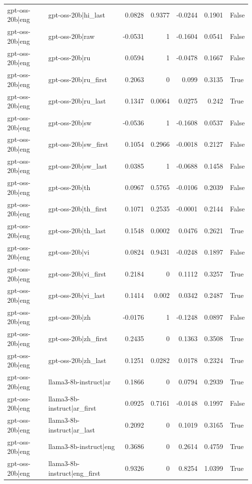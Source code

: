 \begin{table}
\begin{tabular}{l l r r r r l}
gpt-oss-20b|eng & gpt-oss-20b|hi_last & 0.0828 & 0.9377 & -0.0244 & 0.1901 & False \\
gpt-oss-20b|eng & gpt-oss-20b|raw & -0.0531 & 1 & -0.1604 & 0.0541 & False \\
gpt-oss-20b|eng & gpt-oss-20b|ru & 0.0594 & 1 & -0.0478 & 0.1667 & False \\
gpt-oss-20b|eng & gpt-oss-20b|ru_first & 0.2063 & 0 & 0.099 & 0.3135 & True \\
gpt-oss-20b|eng & gpt-oss-20b|ru_last & 0.1347 & 0.0064 & 0.0275 & 0.242 & True \\
gpt-oss-20b|eng & gpt-oss-20b|sw & -0.0536 & 1 & -0.1608 & 0.0537 & False \\
gpt-oss-20b|eng & gpt-oss-20b|sw_first & 0.1054 & 0.2966 & -0.0018 & 0.2127 & False \\
gpt-oss-20b|eng & gpt-oss-20b|sw_last & 0.0385 & 1 & -0.0688 & 0.1458 & False \\
gpt-oss-20b|eng & gpt-oss-20b|th & 0.0967 & 0.5765 & -0.0106 & 0.2039 & False \\
gpt-oss-20b|eng & gpt-oss-20b|th_first & 0.1071 & 0.2535 & -0.0001 & 0.2144 & False \\
gpt-oss-20b|eng & gpt-oss-20b|th_last & 0.1548 & 0.0002 & 0.0476 & 0.2621 & True \\
gpt-oss-20b|eng & gpt-oss-20b|vi & 0.0824 & 0.9431 & -0.0248 & 0.1897 & False \\
gpt-oss-20b|eng & gpt-oss-20b|vi_first & 0.2184 & 0 & 0.1112 & 0.3257 & True \\
gpt-oss-20b|eng & gpt-oss-20b|vi_last & 0.1414 & 0.002 & 0.0342 & 0.2487 & True \\
gpt-oss-20b|eng & gpt-oss-20b|zh & -0.0176 & 1 & -0.1248 & 0.0897 & False \\
gpt-oss-20b|eng & gpt-oss-20b|zh_first & 0.2435 & 0 & 0.1363 & 0.3508 & True \\
gpt-oss-20b|eng & gpt-oss-20b|zh_last & 0.1251 & 0.0282 & 0.0178 & 0.2324 & True \\
gpt-oss-20b|eng & llama3-8b-instruct|ar & 0.1866 & 0 & 0.0794 & 0.2939 & True \\
gpt-oss-20b|eng & llama3-8b-instruct|ar_first & 0.0925 & 0.7161 & -0.0148 & 0.1997 & False \\
gpt-oss-20b|eng & llama3-8b-instruct|ar_last & 0.2092 & 0 & 0.1019 & 0.3165 & True \\
gpt-oss-20b|eng & llama3-8b-instruct|eng & 0.3686 & 0 & 0.2614 & 0.4759 & True \\
gpt-oss-20b|eng & llama3-8b-instruct|eng_first & 0.9326 & 0 & 0.8254 & 1.0399 & True \\

\end{tabular}
\end{table}
